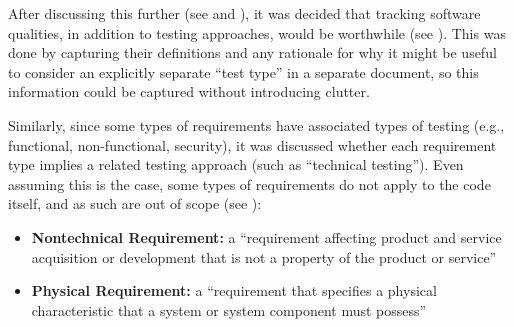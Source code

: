 After discussing this further (see  and ),
it was decided that tracking
software qualities, in addition to testing approaches, would be worthwhile
(see ). This was done by capturing their definitions and any
rationale for why it might be useful to consider an explicitly separate
``test type'' in a separate document, so this information could be captured
without introducing clutter.

Similarly, since some types of requirements have associated types of
testing (e.g., functional, non-functional, security), it was discussed whether
each requirement type implies a related testing approach (such as ``technical
testing''). Even assuming this is the case, some types of requirements do not
apply to the code itself, and as such are out of scope (see ):

\begin{itemize}
      \item \textbf{Nontechnical Requirement:} a ``requirement affecting product
            and service acquisition or development that is not a property of
            the product or service'' \citep[p.~293]{IEEE2017}
      \item \textbf{Physical Requirement:} a ``requirement that specifies a
            physical characteristic that a system or system component must
            possess'' \citep[p.~322]{IEEE2017}
\end{itemize}

